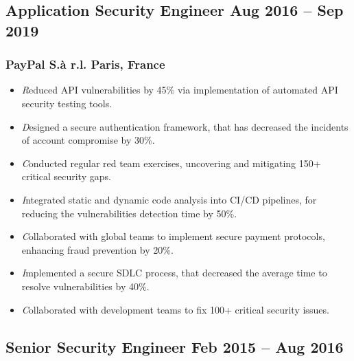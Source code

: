 \subsection{Application Security Engineer \texorpdfstring{\hspace*{\fill}}{\hspace*{\fill}} \normalfont Aug 2016 -- Sep 2019}
\subsubsection{PayPal S.à r.l. \texorpdfstring{\hspace*{\fill}}{\hspace*{\fill}} \normalfont Paris, France} \vspace{0.15cm}

\begin{itemize}
	\item[\textrightarrow] \textit Reduced API vulnerabilities by 45\% via implementation of automated API security testing tools. \vspace{0.1cm}
	\item[\textrightarrow] \textit Designed a secure authentication framework, that has decreased the incidents of account compromise by 30\%. \vspace{0.1cm}
	\item[\textrightarrow] \textit Conducted regular red team exercises, uncovering and mitigating 150+ critical security gaps. \vspace{0.1cm}
	\item[\textrightarrow] \textit Integrated static and dynamic code analysis into CI/CD pipelines, for reducing the vulnerabilities detection time by 50\%. \vspace{0.1cm}
	\item[\textrightarrow] \textit Collaborated with global teams to implement secure payment protocols, enhancing fraud prevention by 20\%. \vspace{0.1cm}
	\item[\textrightarrow] \textit Implemented a secure SDLC process, that decreased the average time to resolve vulnerabilities by 40\%. \vspace{0.1cm}
	\item[\textrightarrow] \textit Collaborated with development teams to fix 100+ critical security issues.
\end{itemize}

\subsection{Senior Security Engineer \texorpdfstring{\hspace*{\fill}}{\hspace*{\fill}} \normalfont Feb 2015 -- Aug 2016}
